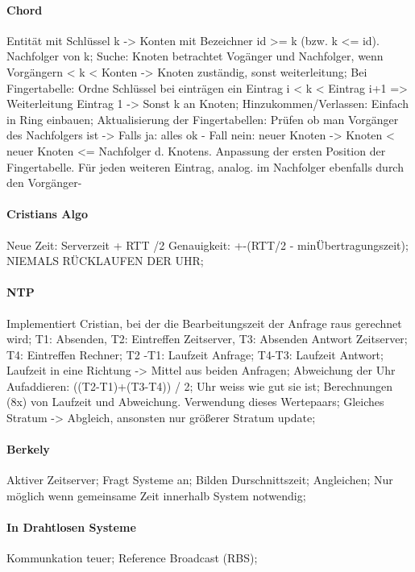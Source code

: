 \documentclass[pagesize,11pt,a4paper]{scrartcl}
\begin{document}
\paragraph*{Chord}
	Entität mit Schlüssel k -> Konten mit Bezeichner id >= k (bzw. k <= id). Nachfolger von k;
	Suche: Knoten betrachtet Vogänger und Nachfolger, wenn Vorgängern < k < Konten -> Knoten zuständig, sonst weiterleitung;
	Bei Fingertabelle: Ordne Schlüssel bei einträgen ein Eintrag i < k < Eintrag i+1 => Weiterleitung Eintrag 1 -> Sonst k an Knoten;
	Hinzukommen/Verlassen: Einfach in Ring einbauen; Aktualisierung der Fingertabellen: Prüfen ob man Vorgänger des Nachfolgers ist ->
		Falls ja: alles ok -
		Fall nein: neuer Knoten -> Knoten < neuer Knoten <= Nachfolger d. Knotens. Anpassung der ersten Position der Fingertabelle. Für jeden weiteren Eintrag, analog. im Nachfolger ebenfalls durch den Vorgänger-

\paragraph*{Cristians Algo}
	Neue Zeit: Serverzeit + RTT /2  Genauigkeit: +-(RTT/2 - minÜbertragungszeit);
	NIEMALS RÜCKLAUFEN DER UHR;

\paragraph*{NTP}
	Implementiert Cristian, bei der die Bearbeitungszeit der Anfrage raus gerechnet wird;
	T1: Absenden, T2: Eintreffen Zeitserver, T3: Absenden Antwort Zeitserver; T4: Eintreffen Rechner;
	T2 -T1: Laufzeit Anfrage; T4-T3: Laufzeit Antwort;
	Laufzeit in eine Richtung -> Mittel aus beiden Anfragen;
	Abweichung der Uhr Aufaddieren: ((T2-T1)+(T3-T4)) / 2;
	Uhr weiss wie gut sie ist;
	Berechnungen (8x) von Laufzeit und Abweichung. Verwendung dieses Wertepaars;
	Gleiches Stratum -> Abgleich, ansonsten nur größerer Stratum update;

\paragraph*{Berkely}
	Aktiver Zeitserver; Fragt Systeme an; Bilden Durschnittszeit; Angleichen;
	Nur möglich wenn gemeinsame Zeit innerhalb System notwendig;

\paragraph*{In Drahtlosen Systeme}
	Kommunkation teuer; Reference Broadcast (RBS);
\end{document}
